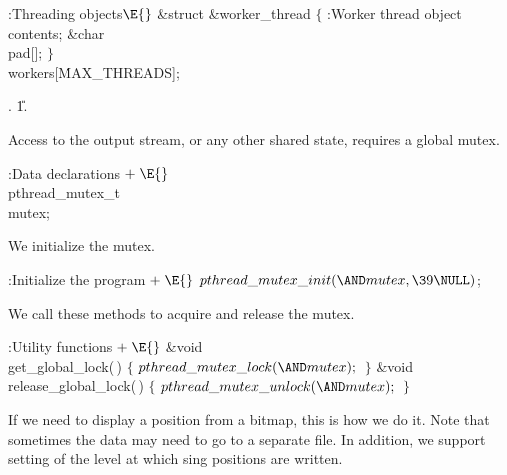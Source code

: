 \Y\B\4:Threading objects\X${}\E{}$\6
\&{struct} \&{worker\_thread} ${}\{{}$\1\6
:Worker thread object contents\X;\7
\&{char} \\{pad}[];\2\6
${}\}{}$ \\{workers}[\.{MAX\_THREADS}];\par
{}.
\U1.\fi

Access to the output stream, or any other shared state, requires
a global mutex.

\Y\B\4:Data declarations\X${}\mathrel+\E{}$\6
\\{pthread\_mutex\_t}\\{mutex};\par
\fi

We initialize the mutex.

\Y\B\4:Initialize the program\X${}\mathrel+\E{}$\6
$\\{pthread\_mutex\_init}({\AND}\\{mutex},\39\NULL){}$;\par
\fi

We call these methods to acquire and release the mutex.

\Y\B\4:Utility functions\X${}\mathrel+\E{}$\6
\&{void} \\{get\_global\_lock}(\,)\1\1\2\2\6
${}\{{}$\1\6
${}\\{pthread\_mutex\_lock}({\AND}\\{mutex});{}$\6
\4${}\}{}$\2\7
\&{void} \\{release\_global\_lock}(\,)\1\1\2\2\6
${}\{{}$\1\6
${}\\{pthread\_mutex\_unlock}({\AND}\\{mutex});{}$\6
\4${}\}{}$\2\par
\fi

If we need to display a position from a bitmap, this is
how we do it.  Note that sometimes the data may need to go
to a separate file.  In addition, we support setting of the
level at which sing positions are written.

